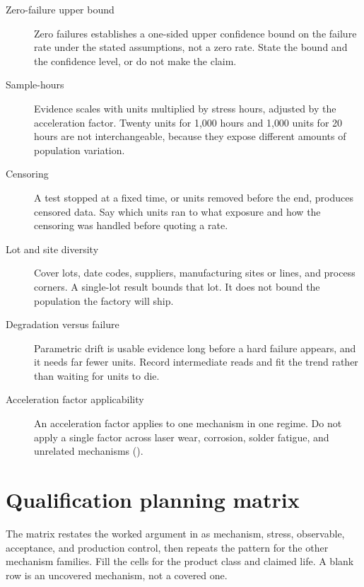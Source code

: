 \begin{description}
\item[Zero-failure upper bound] Zero failures establishes a one-sided upper
      confidence bound on the failure rate under the stated assumptions, not a
      zero rate. State the bound and the confidence level, or do not make the
      claim.
\item[Sample-hours] Evidence scales with units multiplied by stress hours,
      adjusted by the acceleration factor. Twenty units for 1{,}000 hours and
      1{,}000 units for 20 hours are not interchangeable, because they expose
      different amounts of population variation.
\item[Censoring] A test stopped at a fixed time, or units removed before the
      end, produces censored data. Say which units ran to what exposure and how
      the censoring was handled before quoting a rate.
\item[Lot and site diversity] Cover lots, date codes, suppliers, manufacturing
      sites or lines, and process corners. A single-lot result bounds that lot.
      It does not bound the population the factory will ship.
\item[Degradation versus failure] Parametric drift is usable evidence long
      before a hard failure appears, and it needs far fewer units. Record
      intermediate reads and fit the trend rather than waiting for units to
      die.
\item[Acceleration factor applicability] An acceleration factor applies to one
      mechanism in one regime. Do not apply a single factor across laser wear,
      corrosion, solder fatigue, and unrelated mechanisms
      ().
\end{description}


\section{Qualification planning matrix}
\label{sec:qual-planning-matrix}

The matrix restates the worked argument in  as
mechanism, stress, observable, acceptance, and production control, then repeats
the pattern for the other mechanism families. Fill the cells for the product
class and claimed life. A blank row is an uncovered mechanism, not a covered
one.

